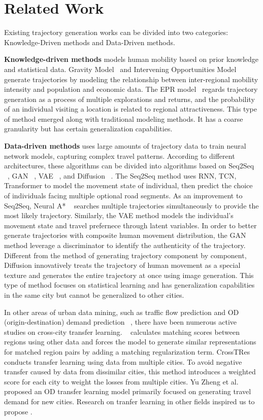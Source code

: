 \section{Related Work}
Existing trajectory generation works can be divided into two categories: Knowledge-Driven methods and Data-Driven methods.

\textbf{Knowledge-driven methods} models human mobility based on prior knowledge and statistical data. Gravity Model~\cite{gravity_1946} and Intervening Opportunities Model~\cite{interventing} generate trajectories by modeling the relationship between inter-regional mobility intensity and population and economic data. The EPR model~\cite{epr_1, epr_2} regards trajectory generation as a process of multiple explorations and returns, and the probability of an individual visiting a location is related to regional attractiveness. This type of method emerged along with traditional modeling methods. It has a coarse granularity but has certain generalization capabilities.

\textbf{Data-driven methods} uses large amounts of trajectory data to train neural network models,  capturing complex travel patterns. According to different architectures, these algorithms can be divided into algorithms based on Seq2Seq ~\cite{Seq2Seq}, GAN ~\cite{SeqGAN}, VAE ~\cite{volunteer, SVAE}, and Diffusion ~\cite{difftraj}. The Seq2Seq method uses RNN, TCN, Transformer to model the movement state of individual, then predict the choice of individuals facing multiple optional road segments. As an improvement to Seq2Seq, Neural A* ~\cite{ts_trajgen} searches multiple trajectories simultaneously to provide the most likely trajectory.  Similarly, the VAE method models the individual's movement state and travel prefernece through latent variables. In order to better generate trajectories with composite human movement distribution, the GAN method leverage a discriminator to identify the authenticity of the trajectory. Different from the method of generating trajectory component by component, Diffusion innovatively treats the trajectory of human movement as a special texture and generates the entire trajectory at once using image generation. This type of method focuses on statistical learning and has generalization capabilities in the same city but cannot be generalized to other cities.

In other areas of urban data mining, such as traffic flow prediction  and OD (origin-destination) demand prediction ~\cite{predji2023spatio, predjiang2023pdformer, predwang2022traffic}, there have been numerous active studies on cross-city transfer learning. ~\cite{wang2018cross} calculates matching scores between regions using other data and forces the model to generate similar representations for matched region pairs by adding a matching regularization term. 
CrossTRes~\cite{jin2022selective} conducts transfer learning using data from multiple cities. To avoid negative transfer caused by data from dissimilar cities, this method introduces a weighted score for each city to weight the losses from multiple cities. Yu Zheng et al.~\cite{he2020human} proposed an OD transfer learning model primarily focused on generating travel demand for new cities. Research on tranfer learning in other fields inspired us to propose \name.

